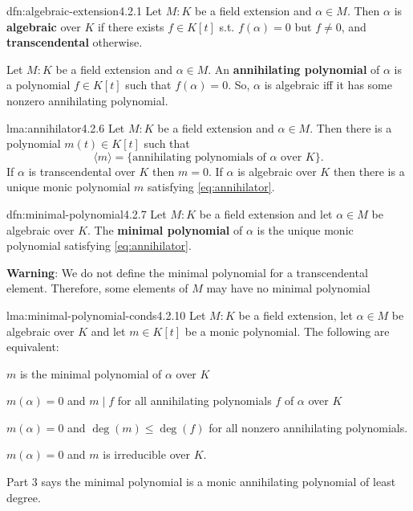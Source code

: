 \documentclass[landscape, 8pt]{extarticle}
\begin{document}
\begin{multicols}{3}
\begin{dfn}{dfn:algebraic-extension}{4.2.1}
    Let $M : K$ be a field extension and $\alpha\in M$. Then $\alpha$ is \textbf{algebraic} over $K$ if there exists $f \in K[t]$ s.t. $f(\alpha) = 0$ but $f \ne 0$, and \textbf{transcendental} otherwise.

    \longrule{0.08ex}
    Let $M : K$ be a field extension and $\alpha\in M$. An \textbf{annihilating polynomial} of $\alpha$ is a polynomial $f \in K[t]$ such that $f(\alpha)=0$. So, $\alpha$ is algebraic iff it has some nonzero annihilating polynomial.
\end{dfn}


\begin{lma}[Annihilaters]{lma:annihilator}{4.2.6}
    Let $M : K$ be a field extension and $\alpha\in M$. Then there is a polynomial $m(t) \in K[t]$ such that
    \begin{equation}\label{eq:annihilator}\langle m \rangle = \{\text{annihilating polynomials of $\alpha$ over $K$}\}.\end{equation}
    If $\alpha$ is transcendental over $K$ then $m = 0$. If $\alpha$ is algebraic over $K$ then there is a unique monic polynomial $m$ satisfying \eqref{eq:annihilator}.
\end{lma}

\begin{dfn}{dfn:minimal-polynomial}{4.2.7}
    Let $M : K$ be a field extension and let $\alpha\in M$ be algebraic over $K$. The \textbf{minimal polynomial} of $\alpha$ is the unique monic polynomial satisfying \eqref{eq:annihilator}.

    \textbf{Warning}: We do not define the minimal polynomial for a transcendental element. Therefore, some elements of $M$ may have no minimal polynomial
\end{dfn}

\begin{lma}{lma:minimal-polynomial-conds}{4.2.10}
    Let $M : K$ be a field extension, let $\alpha \in M$ be algebraic over $K$ and let $m\in K[t]$ be a monic polynomial. The following are equivalent:
    \begin{enumerate-tight}
        \item $m$ is the minimal polynomial of $\alpha$ over $K$
        \item $m(\alpha) = 0$ and $m \mid f$ for all annihilating polynomials $f$ of $\alpha$ over $K$
        \item $m(\alpha) = 0$ and $\deg(m) \le \deg (f)$ for all nonzero annihilating polynomials.
        \item $m(\alpha) = 0$ and $m$ is irreducible over $K$.
    \end{enumerate-tight}
    Part $3$ says the minimal polynomial is a monic annihilating polynomial of least degree.
\end{lma}


\end{multicols}
\end{document}
